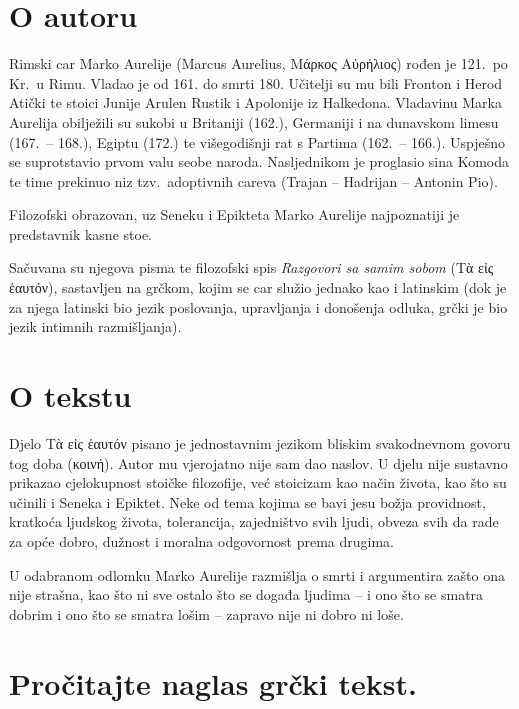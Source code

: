 \section*{O autoru}

Rimski car Marko Aurelije (Marcus Aurelius, \textgreek[variant=ancient]{Μάρκος Αὐρήλιος}) rođen je 121.\ po Kr.\ u Rimu. Vladao je od 161. do smrti 180. Učitelji su mu bili Fronton i Herod Atički te stoici Junije Arulen Rustik i Apolonije iz Halkedona. Vladavinu Marka Aurelija obilježili su sukobi u Britaniji (162.), Germaniji i na dunavskom limesu (167.\ – 168.), Egiptu (172.) te višegodišnji rat s Partima (162.\ – 166.). Uspješno se suprotstavio prvom valu seobe naroda. Nasljednikom je proglasio sina Komoda te time prekinuo niz tzv.\ adoptivnih careva (Trajan – Hadrijan – Antonin Pio). 

Filozofski obrazovan, uz Seneku i Epikteta Marko Aurelije najpoznatiji je predstavnik kasne stoe.

Sačuvana su njegova pisma te filozofski spis \textit{Razgovori sa samim sobom} \textgreek[variant=ancient]{(Tὰ εἰς ἑαυτόν),} sastavljen na grčkom, kojim se car služio jednako kao i latinskim (dok je za njega latinski bio jezik poslovanja, upravljanja i donošenja odluka, grčki je bio jezik intimnih razmišljanja).


\section*{O tekstu}

Djelo \textgreek[variant=ancient]{Tὰ εἰς ἑαυτόν} pisano je jednostavnim jezikom bliskim svakodnevnom govoru tog doba \textgreek[variant=ancient]{(κοινή).} Autor mu vjerojatno nije sam dao naslov. U djelu nije sustavno prikazao cjelokupnost stoičke filozofije, već stoicizam kao način života, kao što su učinili i Seneka i Epiktet. Neke od tema kojima se bavi jesu božja providnost, kratkoća ljudskog života, tolerancija, zajedništvo svih ljudi, obveza svih da rade za opće dobro, dužnost i moralna odgovornost prema drugima.

U odabranom odlomku Marko Aurelije razmišlja o smrti i argumentira zašto ona nije strašna, kao što ni sve ostalo što se događa ljudima – i ono što se smatra dobrim i ono što se smatra lošim – zapravo nije ni dobro ni loše.

\section*{Pročitajte naglas grčki tekst.}

